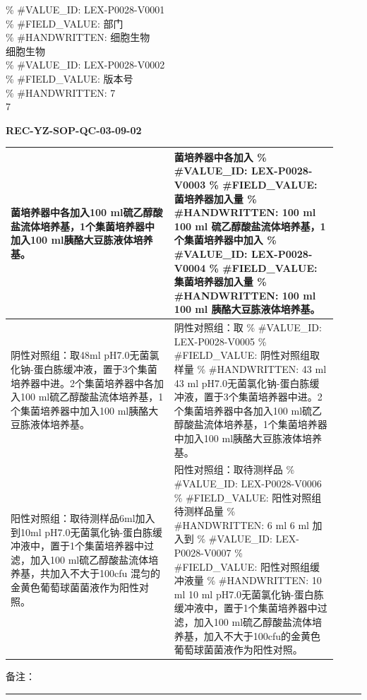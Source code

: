 \documentclass[UTF8,10pt,a4paper,fontset=fandol]{ctexart}
\newcommand{\fieldvalue}[1]{#1}
\newcommand{\handwritten}[1]{#1}
\begin{document}
\begin{flushright}
\% #VALUE_ID: LEX-P0028-V0001\\
\% #FIELD_VALUE: 部门\\
\% #HANDWRITTEN: 细胞生物\\
\fieldvalue{\handwritten{细胞生物}}\\
\% #VALUE_ID: LEX-P0028-V0002\\
\% #FIELD_VALUE: 版本号\\
\% #HANDWRITTEN: 7\\
\fieldvalue{\handwritten{7}}
\end{flushright}

\noindent
\textbf{REC-YZ-SOP-QC-03-09-02}

\begin{tabular}{|p{0.46\linewidth}|p{0.46\linewidth}|}
\hline
菌培养器中各加入100 ml硫乙醇酸盐流体培养基，1个集菌培养器中加入100 ml胰酪大豆胨液体培养基。 &
菌培养器中各加入
\% #VALUE_ID: LEX-P0028-V0003
\% #FIELD_VALUE: 菌培养器加入量
\% #HANDWRITTEN: 100 ml
\fieldvalue{\handwritten{100 ml}}
硫乙醇酸盐流体培养基，1个集菌培养器中加入
\% #VALUE_ID: LEX-P0028-V0004
\% #FIELD_VALUE: 集菌培养器加入量
\% #HANDWRITTEN: 100 ml
\fieldvalue{\handwritten{100 ml}}
胰酪大豆胨液体培养基。\\
\hline
阴性对照组：取48ml pH7.0无菌氯化钠-蛋白胨缓冲液，置于3个集菌培养器中进。2个集菌培养器中各加入100 ml硫乙醇酸盐流体培养基，1个集菌培养器中加入100 ml胰酪大豆胨液体培养基。 &
阴性对照组：取
\% #VALUE_ID: LEX-P0028-V0005
\% #FIELD_VALUE: 阴性对照组取样量
\% #HANDWRITTEN: 43 ml
\fieldvalue{\handwritten{43 ml}}
pH7.0无菌氯化钠-蛋白胨缓冲液，置于3个集菌培养器中进。2个集菌培养器中各加入100 ml硫乙醇酸盐流体培养基，1个集菌培养器中加入100 ml胰酪大豆胨液体培养基。\\
\hline
阳性对照组：取待测样品6ml加入到10ml pH7.0无菌氯化钠-蛋白胨缓冲液中，置于1个集菌培养器中过滤，加入100 ml硫乙醇酸盐流体培养基，共加入不大于100cfu 混匀的金黄色葡萄球菌菌液作为阳性对照。 &
阳性对照组：取待测样品
\% #VALUE_ID: LEX-P0028-V0006
\% #FIELD_VALUE: 阳性对照组待测样品量
\% #HANDWRITTEN: 6 ml
\fieldvalue{\handwritten{6 ml}}
加入到
\% #VALUE_ID: LEX-P0028-V0007
\% #FIELD_VALUE: 阳性对照组缓冲液量
\% #HANDWRITTEN: 10 ml
\fieldvalue{\handwritten{10 ml}}
pH7.0无菌氯化钠-蛋白胨缓冲液中，置于1个集菌培养器中过滤，加入100 ml硫乙醇酸盐流体培养基，加入不大于100cfu的金黄色葡萄球菌菌液作为阳性对照。\\
\hline
\end{tabular}

\vspace{2pt}
\noindent 备注：\rule{0.88\linewidth}{0.4pt}
\end{document}
